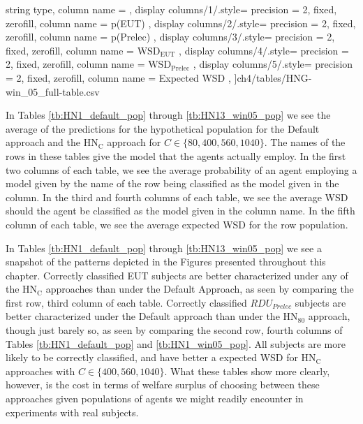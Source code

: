 \documentclass[../main.tex]{subfiles}
\begin{document}
{\begin{table}[h!]
\begin{adjustbox}{}
{			string type,
			column name = {}
		},
		display columns/1/.style={
			precision = 2,
			fixed,
			zerofill,
			column name = {p(EUT)}
		},
		display columns/2/.style={
			precision = 2,
			fixed,
			zerofill,
			column name = {p(Prelec)}
		},
		display columns/3/.style={
			precision = 2,
			fixed,
			zerofill,
			column name = {$\text{WSD}_{\text{EUT}}$}
		},
		display columns/4/.style={
			precision = 2,
			fixed,
			zerofill,
			column name = {$\text{WSD}_{\text{Prelec}}$}
		},
		display columns/5/.style={
			precision = 2,
			fixed,
			zerofill,
			column name = {Expected WSD}
		},
		]{ch4/tables/HNG-win_05_full-table.csv} %
	\end{adjustbox}
\end{table}
\doublespacing
}

\clearpage

In Tables \ref{tb:HN1_default_pop} through \ref{tb:HN13_win05_pop} we see the average of the predictions for the hypothetical population for the Default approach and the $\text{HN}_\text{C}$ approach for $C \in \lbrace 80, 400, 560, 1040\rbrace$.
The names of the rows in these tables give the model that the agents actually employ.
In the first two columns of each table, we see the average probability of an agent employing a model given by the name of the row being classified as the model given in the column.
In the third and fourth columns of each table, we see the average WSD should the agent be classified as the model given in the column name.
In the fifth column of each table, we see the average expected WSD for the row population.

In Tables \ref{tb:HN1_default_pop} through \ref{tb:HN13_win05_pop} we see a snapshot of the patterns depicted in the Figures presented throughout this chapter.
Correctly classified EUT subjects are better characterized under any of the $\text{HN}_\text{C}$ approaches than under the Default Approach, as seen by comparing the first row, third column of each table.
Correctly classified $\mathit{RDU_{Prelec}}$ subjects are better characterized under the Default approach than under the $\text{HN}_{80}$ approach, though just barely so, as seen by comparing the second row, fourth columns of Tables \ref{tb:HN1_default_pop} and \ref{tb:HN1_win05_pop}.
All subjects are more likely to be correctly classified, and have better a expected WSD for $\text{HN}_\text{C}$ approaches with $C \in \lbrace 400, 560, 1040\rbrace$.
What these tables show more clearly, however, is the cost in terms of welfare surplus of choosing between these approaches given populations of agents we might readily encounter in experiments with real subjects.
\end{document}
